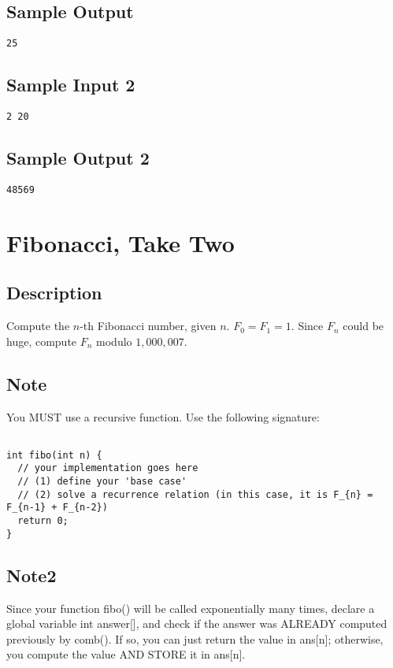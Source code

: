 \subsection*{Sample Output}
\begin{verbatim}
25
\end{verbatim}

\subsection*{Sample Input 2}
\begin{verbatim}
2 20
\end{verbatim}

\subsection*{Sample Output 2}
\begin{verbatim}
48569
\end{verbatim}

\newpage


\section{Fibonacci, Take Two}

\subsection*{Description}
Compute the $n$-th Fibonacci number, given $n$. 
$F_0 = F_1 = 1$.  Since $F_n$ could be huge, compute $F_n$ modulo $1,000,007$. 

\subsection*{Note}
You MUST use a recursive function. Use the following signature:
\begin{verbatim}

int fibo(int n) {
  // your implementation goes here
  // (1) define your 'base case'
  // (2) solve a recurrence relation (in this case, it is F_{n} = F_{n-1} + F_{n-2})
  return 0;
}
\end{verbatim}

\subsection*{Note2}
Since your function fibo() will be called exponentially many times, declare a global variable int answer[], and check if the answer was ALREADY computed previously by comb(). If so, you can just return the value in ans[n]; otherwise, you compute the value AND STORE it in ans[n].

